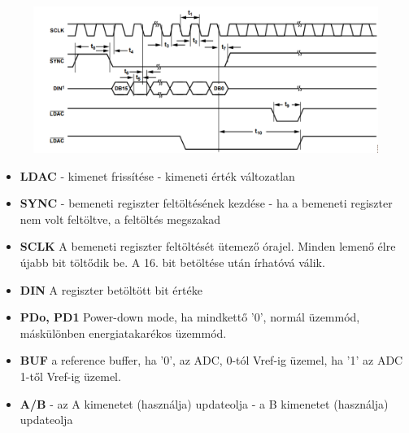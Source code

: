 \documentclass[12pt]{article}
\begin{document}
    \begin{figure}[h]
      \includegraphics{dac_jelek}
      \centering  
    \end{figure}
    
    \begin{itemize}
      \item \textbf{LDAC} \linebreak
             - kimenet frissítése \linebreak
             - kimeneti érték változatlan
      \item \textbf{SYNC} \linebreak
             - bemeneti regiszter feltöltésének kezdése \linebreak
             - ha a bemeneti regiszter nem volt feltöltve, a feltöltés megszakad
      \item \textbf{SCLK} \linebreak
            \quad A bemeneti regiszter feltöltését ütemező órajel. Minden lemenő élre újabb bit töltődik be.
            A 16. bit betöltése után írhatóvá válik.  
      \item \textbf{DIN} \linebreak
            \quad A regiszter betöltött bit értéke
      \item \textbf{PDo, PD1} \linebreak
            \quad Power-down mode, ha mindkettő '0', normál üzemmód, máskülönben energiatakarékos üzemmód.
      \item \textbf{BUF} \linebreak
            \quad a reference buffer, ha '0', az ADC, 0-tól Vref-ig üzemel, ha '1' az ADC 1-től Vref-ig üzemel.
      \item \textbf{A/B} \linebreak
             - az A kimenetet (használja) updateolja \linebreak
             - a B kimenetet (használja) updateolja
    \end{itemize}
    
\end{document}

